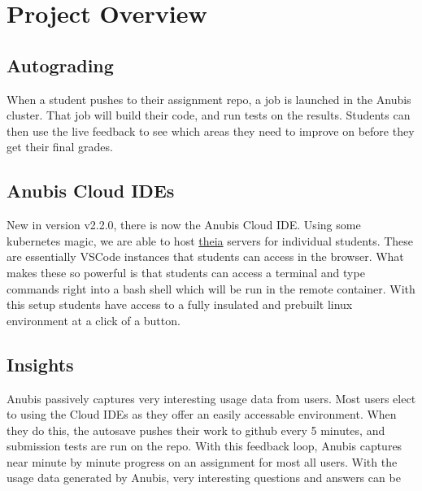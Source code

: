 \chapter{Project Overview}\label{ch:overview}


\section{Autograding}\label{sec:autograding}

When a student pushes to their assignment repo, a job is launched in the
Anubis cluster. That job will build their code, and run tests on the results.
Students can then use the live feedback to see which areas they need to improve on
before they get their final grades.


\section{Anubis Cloud IDEs}\label{sec:anubis-cloud-ides}

New in version v2.2.0, there is now the Anubis Cloud IDE. Using some kubernetes magic, we are able to
host \href{https://theia-ide.org/}{theia} servers for individual students. These are essentially VSCode instances
that students can access in the browser. What makes these so powerful is that students can access a terminal
and type commands right into a bash shell which will be run in the remote container. With this setup students
have access to a fully insulated and prebuilt linux environment at a click of a button.


\section{Insights}\label{sec:insights}

Anubis passively captures very interesting usage data from users.
Most users elect to using the Cloud IDEs as they offer an easily accessable environment.
When they do this, the autosave pushes their work to github every 5 minutes, and
submission tests are run on the repo.
With this feedback loop, Anubis captures near minute by minute progress on an assignment
for most all users.
With the usage data generated by Anubis, very interesting questions and answers can be
